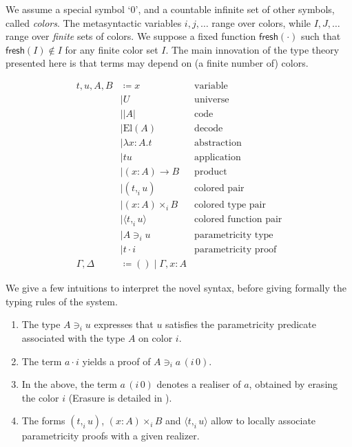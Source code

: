 \documentclass[english]{PaperTools/latex/lipics}
\newcommand\CP[3]{(#2,_{#1} #3)}
\newcommand\CTimes[2]{(#2) ×_{#1}}
\newcommand\param[1]{\!\cdot\!#1}
\newcommand\op[1]{∋_{#1}}
\newcommand\fp[3]{⟨#2 ,_{#1} #3⟩}
\newcommand\mor[2]{({#1}\,{#2})}
\newcommand\proj[2]{{#2}\,\mor{#1}0}
\def\fresh#1{\mathsf{fresh}(#1)}
\def\El#1{\mathrm{El}(#1)}
\begin{document}
We assume a special symbol ‘0’, and a countable infinite set of other
symbols, called \emph{colors}.
The metasyntactic variables $i,j,\ldots$ range over colors, while
$I,J,…$ range over \emph{finite} sets of colors.
We suppose a fixed function $\fresh{·}$ such that
$\fresh{I} ∉ I$ for any finite color set $I$.
%
The main innovation of the type theory
presented here is that terms may depend on (a finite number of)
colors.
\begin{definition}
  \begin{align*}
    t,u,A,B & \coloneqq x & \text {variable} \\
            & \mid U & \text{universe} \\ 
            & \mid |A| & \text{code} \\ 
            & \mid \El{A} & \text{decode} \\
            & \mid λx:A. t & \text{abstraction} \\
            & \mid t u & \text{application} \\ 
            & \mid (x:A) → B & \text{product} \\
            & \mid \CP i t u & \text{colored pair} \\
            & \mid \CTimes i {x:A} B  & \text{colored type pair} \\
            & \mid \fp i t u & \text{colored function pair}\\
            & \mid A \op i u & \text{parametricity type} \\
            & \mid t \param i & \text{parametricity proof} \\
    \Gamma,\Delta & \coloneqq () \mid \Gamma,x:A
  \end{align*}
\end{definition}

We give a few intuitions to interpret the novel syntax, before giving formally the typing rules of the system. 
\begin{enumerate}
\item The type $A \op i u$ expresses that $u$ satisfies the
  parametricity predicate associated with the type $A$ on color $i$.
\item The term $a \param i$ yields a proof of $A \op i \proj i a$.
\item In the above, the term $\proj i a$ denotes a realiser of $a$,
  obtained by erasing the color $i$ (Erasure is detailed in
  ).
\item The forms $\CP i t u$, $\CTimes i {x:A} B$ and $\fp i t u$ allow to
  locally associate parametricity proofs with a given realizer.
\end{enumerate}
\end{document}
